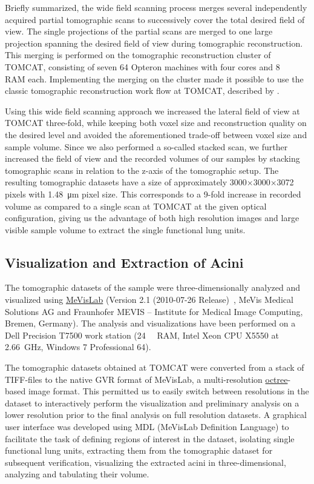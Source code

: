 \documentclass[%
	paper=a4,%
	abstract=true,%
	]{scrartcl}
\begin{document}
Briefly summarized, the wide field scanning process merges several independently acquired partial tomographic scans to successively cover the total desired field of view. The single projections of the partial scans are merged to one large projection spanning the desired field of view during tomographic reconstruction. This merging is performed on the tomographic reconstruction cluster of TOMCAT, consisting of seven \SI{64}{\bit} Opteron machines with four cores and \SI{8}{\giga\byte} RAM each. Implementing the merging on the cluster made it possible to use the classic tomographic reconstruction work flow at TOMCAT, described by \citet{Hintermueller2010}.

Using this wide field scanning approach we increased the lateral field of view at TOMCAT three-fold, while keeping both voxel size and reconstruction quality on the desired level and avoided the aforementioned trade-off between voxel size and sample volume. Since we also performed a so-called stacked scan, we further increased the field of view and the recorded volumes of our samples by stacking tomographic scans in relation to the z-axis of the tomographic setup. The resulting tomographic datasets have a size of approximately 3000\(\times\)3000\(\times\)3072 pixels with \SI{1.48}{\micro\meter} pixel size. This corresponds to a 9-fold increase in recorded volume as compared to a single scan at TOMCAT at the given optical configuration, giving us the advantage of both high resolution images and large visible sample volume to extract the single functional lung units.

\subsection{Visualization and Extraction of Acini}
The tomographic datasets of the sample were three-dimensionally analyzed and visualized using \href{http://mevislab.de}{MeVisLab} (Version 2.1 (2010-07-26 Release)~\cite{Bitter2007}, MeVis Medical Solutions AG and Fraunhofer MEVIS -- Institute for Medical Image Computing, Bremen, Germany). The analysis and visualizations have been performed on a Dell Precision T7500 work station (\SI{24}{\giga\byte} RAM, Intel Xeon CPU X5550 at \SI{2.66}{\giga\hertz}, Windows 7 Professional \SI{64}{\bit}). 

The tomographic datasets obtained at TOMCAT were converted from a stack of TIFF-files to the native GVR format of MeVisLab, a multi-resolution \href{https://secure.wikimedia.org/wikipedia/en/w/index.php?title=Octree&oldid=409131920}{octree}-based image format. This permitted us to easily switch between resolutions in the dataset to interactively perform the visualization and preliminary analysis on a lower resolution prior to the final analysis on full resolution datasets. A graphical user interface was developed using MDL (MeVisLab Definition Language) to facilitate the task of defining regions of interest in the dataset, isolating single functional lung units, extracting them from the tomographic dataset for subsequent verification, visualizing the extracted acini in three-dimensional, analyzing and tabulating their volume.
\end{document}
